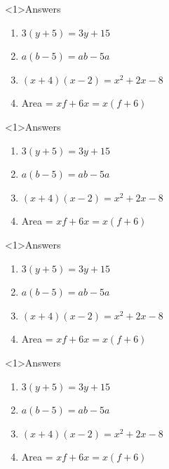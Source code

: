 \documentclass{beamer}
\begin{document}
\begin{frame}<1>{Answers}
\begin{enumerate}
  \item \(3(y+5)=3y+15\)
  \item \(a(b-5)=ab-5a\)
  \item \((x+4)(x-2)=x^2+2x-8\)
  \item Area = \(xf + 6x = x(f+6)\)
\end{enumerate}
\end{frame}
\begin{frame}<1>{Answers}
\begin{enumerate}
  \item \(3(y+5)=3y+15\)
  \item \(a(b-5)=ab-5a\)
  \item \((x+4)(x-2)=x^2+2x-8\)
  \item Area = \(xf + 6x = x(f+6)\)
\end{enumerate}
\end{frame}
\begin{frame}<1>{Answers}
\begin{enumerate}
  \item \(3(y+5)=3y+15\)
  \item \(a(b-5)=ab-5a\)
  \item \((x+4)(x-2)=x^2+2x-8\)
  \item Area = \(xf + 6x = x(f+6)\)
\end{enumerate}
\end{frame}
\begin{frame}<1>{Answers}
\begin{enumerate}
  \item \(3(y+5)=3y+15\)
  \item \(a(b-5)=ab-5a\)
  \item \((x+4)(x-2)=x^2+2x-8\)
  \item Area = \(xf + 6x = x(f+6)\)
\end{enumerate}
\end{frame}
\end{document}
